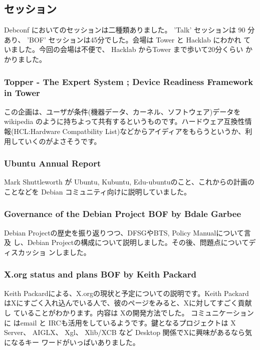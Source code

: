 \documentclass[mingoth,a4paper]{jsarticle}
\begin{document}
\clearpage

\subsection{セッション}

Debconf においてのセッションは二種類ありました。 'Talk' セッションは 90
分あり、 'BOF' セッションは45分でした。会場は Tower と Hacklab にわかれ
ていました。今回の会場は不便で、 Hacklab からTower まで歩いて20分くらい
かかりました。

\subsubsection{Topper - The Expert System ; Device Readiness Framework in Tower}

この企画は、ユーザが条件(機器データ、カーネル、ソフトウェア)データを
wikipedia のように持ちよって共有するというものです。ハードウェア互換性情
報(HCL:Hardware Compatbility List)などからアイディアをもらうというか、利
用していくのがよさそうです。

\subsubsection{Ubuntu Annual Report}

Mark Shuttleworth が Ubuntu, Kubuntu, Edu-ubuntuのこと、これからの計画の
 ことなどを Debian コミュニティ向けに説明していました。

\subsubsection{Governance of the Debian Project BOF by Bdale Garbee }

Debian Projectの歴史を振り返りつつ、DFSGやBTS, Policy Manualについて言及
し、Debian Projectの構成について説明しました。その後、問題点についてディスカッショ
ンしました。

\subsubsection{X.org status and plans BOF by  Keith Packard}

Keith Packardによる、X.orgの現状と予定についての説明です。Keith Packard 
はXにすごく入れ込んでいる人で、彼のページをみると、Xに対してすごく貢献し
ていることがわかります。内容は Xの開発方法でした。 コミュニケーションに
はemail と IRCも活用をしているようです。鍵となるプロジェクトは X Server、 
AIGLX、 Xgl、 Xlib/XCB など Desktop 関係でXに興味があるなら気になるキー
ワードがいっぱいありました。
\end{document}
